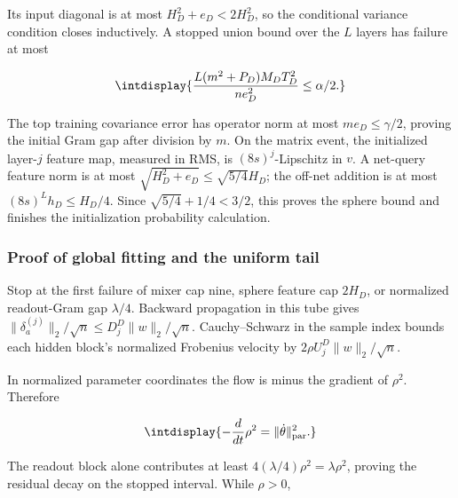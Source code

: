 Its input diagonal is at most \(H_D^2+e_D<2H_D^2\), so the conditional variance condition closes inductively. A stopped union bound over the \(L\) layers has failure at most


\begingroup\renewcommand{\theHequation}{intdisplay.443}
\begin{equation*}
\intdisplay{
\frac{L(m^2+P_D)M_DT_D^2}{ne_D^2}\le\alpha/2.
}
\end{equation*}
\endgroup


The top training covariance error has operator norm at most \(me_D\le\gamma/2\), proving the initial Gram gap after division by \(m\). On the matrix event, the initialized layer-\(j\) feature map, measured in RMS, is \((8s)^j\)-Lipschitz in \(v\). A net-query feature norm is at most \(\sqrt{H_D^2+e_D}\le\sqrt{5/4}H_D\); the off-net addition is at most \((8s)^Lh_D\le H_D/4\). Since \(\sqrt{5/4}+1/4<3/2\), this proves the sphere bound and finishes the initialization probability calculation.


\subsubsection{Proof of global fitting and the uniform tail}



Stop at the first failure of mixer cap nine, sphere feature cap \(2H_D\), or normalized readout-Gram gap \(\lambda/4\). Backward propagation in this tube gives \(\|\delta_a^{(j)}\|_2/\sqrt n\le D_j^D\|w\|_2/\sqrt n\). Cauchy--Schwarz in the sample index bounds each hidden block's normalized Frobenius velocity by \(2\rho U_j^D\|w\|_2/\sqrt n\).



In normalized parameter coordinates the flow is minus the gradient of \(\rho^2\). Therefore


\begingroup\renewcommand{\theHequation}{intdisplay.444}
\begin{equation*}
\intdisplay{
-\frac{d}{dt}\rho^2=\|\dot\theta\|_{\rm par}^2.
}
\end{equation*}
\endgroup


The readout block alone contributes at least \(4(\lambda/4)\rho^2=\lambda\rho^2\), proving the residual decay on the stopped interval. While \(\rho>0\),


